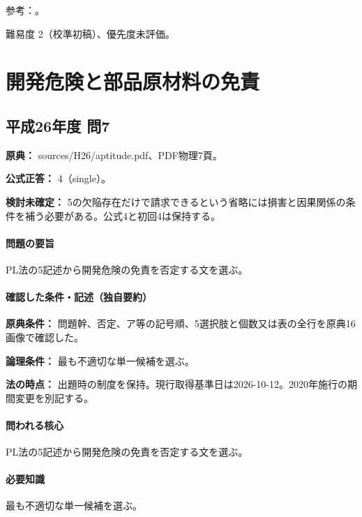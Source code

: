 \par 参考：\cite{env_ar5,env_rain2017,env_evac2021,env_warning2026}。

\par 難易度 2（校準初稿）、優先度未評価。

\section{開発危険と部品原材料の免責}

\subsection{平成26年度 問7}
\label{q:h26-reg-apt-07}

\noindent\textbf{原典：} sources/H26/aptitude.pdf、PDF物理7頁。

\textbf{公式正答：} 4（single）。

\par\textbf{検討未確定：} 5の欠陥存在だけで請求できるという省略には損害と因果関係の条件を補う必要がある。公式4と初回4は保持する。

\paragraph{問題の要旨} PL法の5記述から開発危険の免責を否定する文を選ぶ。

\paragraph{確認した条件・記述（独自要約）}\mbox{}\par

\noindent\textbf{原典条件：} 問題幹、否定、ア等の記号順、5選択肢と個数又は表の全行を原典16画像で確認した。\par

\noindent\textbf{論理条件：} 最も不適切な単一候補を選ぶ。\par

\noindent\textbf{法の時点：} 出題時の制度を保持。現行取得基準日は2026-10-12。2020年施行の期間変更を別記する。\par

\paragraph{問われる核心} PL法の5記述から開発危険の免責を否定する文を選ぶ。

\paragraph{必要知識} 最も不適切な単一候補を選ぶ。

